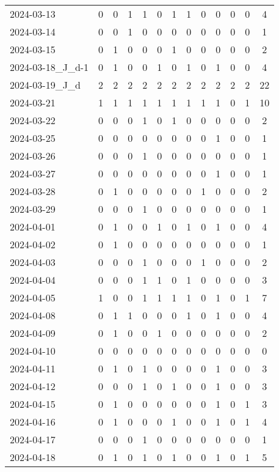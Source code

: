 \documentclass[dvipdfmx,oneside]{article}
\begin{document}
\begin{longtable}{lcccccccccccc}
2024-03-13 & 0 & 0 & 1 & 1 & 0 & 1 & 1 & 0 & 0 & 0 & 0 & 4 \\
2024-03-14 & 0 & 0 & 1 & 0 & 0 & 0 & 0 & 0 & 0 & 0 & 0 & 1 \\
2024-03-15 & 0 & 1 & 0 & 0 & 0 & 1 & 0 & 0 & 0 & 0 & 0 & 2 \\
2024-03-18\_J\_d-1 & 0 & 1 & 0 & 0 & 1 & 0 & 1 & 0 & 1 & 0 & 0 & 4 \\
2024-03-19\_J\_d & 2 & 2 & 2 & 2 & 2 & 2 & 2 & 2 & 2 & 2 & 2 & 22 \\
2024-03-21 & 1 & 1 & 1 & 1 & 1 & 1 & 1 & 1 & 1 & 0 & 1 & 10 \\
2024-03-22 & 0 & 0 & 0 & 1 & 0 & 1 & 0 & 0 & 0 & 0 & 0 & 2 \\
2024-03-25 & 0 & 0 & 0 & 0 & 0 & 0 & 0 & 0 & 1 & 0 & 0 & 1 \\
2024-03-26 & 0 & 0 & 0 & 1 & 0 & 0 & 0 & 0 & 0 & 0 & 0 & 1 \\
2024-03-27 & 0 & 0 & 0 & 0 & 0 & 0 & 0 & 0 & 1 & 0 & 0 & 1 \\
2024-03-28 & 0 & 1 & 0 & 0 & 0 & 0 & 0 & 1 & 0 & 0 & 0 & 2 \\
2024-03-29 & 0 & 0 & 0 & 1 & 0 & 0 & 0 & 0 & 0 & 0 & 0 & 1 \\
2024-04-01 & 0 & 1 & 0 & 0 & 1 & 0 & 1 & 0 & 1 & 0 & 0 & 4 \\
2024-04-02 & 0 & 1 & 0 & 0 & 0 & 0 & 0 & 0 & 0 & 0 & 0 & 1 \\
2024-04-03 & 0 & 0 & 0 & 1 & 0 & 0 & 0 & 1 & 0 & 0 & 0 & 2 \\
2024-04-04 & 0 & 0 & 0 & 1 & 1 & 0 & 1 & 0 & 0 & 0 & 0 & 3 \\
2024-04-05 & 1 & 0 & 0 & 1 & 1 & 1 & 1 & 0 & 1 & 0 & 1 & 7 \\
2024-04-08 & 0 & 1 & 1 & 0 & 0 & 0 & 1 & 0 & 1 & 0 & 0 & 4 \\
2024-04-09 & 0 & 1 & 0 & 0 & 1 & 0 & 0 & 0 & 0 & 0 & 0 & 2 \\
2024-04-10 & 0 & 0 & 0 & 0 & 0 & 0 & 0 & 0 & 0 & 0 & 0 & 0 \\
2024-04-11 & 0 & 1 & 0 & 1 & 0 & 0 & 0 & 0 & 1 & 0 & 0 & 3 \\
2024-04-12 & 0 & 0 & 0 & 1 & 0 & 1 & 0 & 0 & 1 & 0 & 0 & 3 \\
2024-04-15 & 0 & 1 & 0 & 0 & 0 & 0 & 0 & 0 & 1 & 0 & 1 & 3 \\
2024-04-16 & 0 & 1 & 0 & 0 & 0 & 1 & 0 & 0 & 1 & 0 & 1 & 4 \\
2024-04-17 & 0 & 0 & 0 & 1 & 0 & 0 & 0 & 0 & 0 & 0 & 0 & 1 \\
2024-04-18 & 0 & 1 & 0 & 1 & 0 & 1 & 0 & 0 & 1 & 0 & 1 & 5 \\

\end{longtable}
\end{document}
